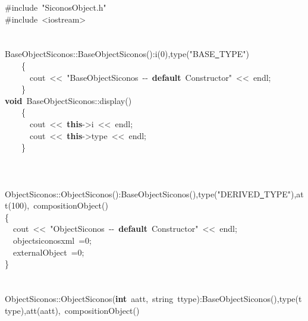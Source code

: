 {\ttfamily \raggedright \small
\ \\
\ \\
\ \\
\ \\
\ \\
\ \\
\ \\
\ \\
\ \\
\ \\
\ \\
\ \\
\ \\
\ \\
\ \\
\ \\
\ \\
\#include\ "{}SiconosObject.h"{}\\
\#include\ <{}iostream>{}\\
\ \\
\ \\
BaseObjectSiconos::BaseObjectSiconos():i(0),type("{}BASE\underline\ TYPE"{})\\
\ \ \ \ \{\ \\
\ \ \ \ \ \ cout\ <{}<{}\ "{}BaseObjectSiconos\ -{}-{}\ \textbf{default}\ Constructor"{}\ <{}<{}\ endl;\\
\ \ \ \ \}\\
\textbf{void}\ BaseObjectSiconos::display()\\
\ \ \ \ \{\\
\ \ \ \ \ \ cout\ <{}<{}\ \textbf{this}-{}>{}i\ <{}<{}\ endl;\\
\ \ \ \ \ \ cout\ <{}<{}\ \textbf{this}-{}>{}type\ <{}<{}\ endl;\\
\ \ \ \ \}\\
\ \\
\ \\
\ \\
ObjectSiconos::ObjectSiconos():BaseObjectSiconos(),type("{}DERIVED\underline\ TYPE"{}),att(100),\ compositionObject()\\
\{\\
\ \ cout\ <{}<{}\ "{}ObjectSiconos\ -{}-{}\ \textbf{default}\ Constructor"{}\ <{}<{}\ endl;\\
\ \ objectsiconosxml\ =0;\\
\ \ externalObject\ =0;\\
\}\\
\ \\
\ \\
ObjectSiconos::ObjectSiconos(\textbf{int}\ aatt,\ string\ ttype):BaseObjectSiconos(),type(ttype),att(aatt),\ compositionObject()\\
}
